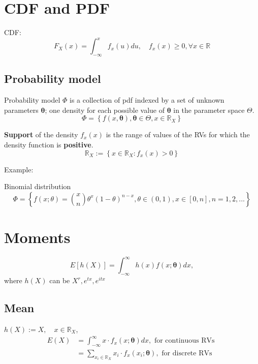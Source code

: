 \documentclass[12pt]{article}
\title{}
\author{}
\date{}
\begin{document}
\maketitle


\section{CDF and PDF}
CDF:
\begin{equation*}
F_{X}(x) = \int_{ - \infty }^{x}f_{x}(u)du, \quad f_{x}(x) \ge 0, \forall x \in \mathbb{R} 
\end{equation*}


\subsection{Probability model}
Probability model $ \Phi $ is a collection of pdf indexed by a set of unknown parameters
$ \bm{\theta} $; one density for each possible value of $ \bm{\theta} $ in the parameter
space $ \Theta $.
\begin{equation*}
\Phi = \left\{ f(x,\bm{\theta}), \bm{\theta}\in \Theta, x \in \mathbb{R}_{X} \right\} 
\end{equation*}

{\textbf {Support}} of the density $ f_{x}(x) $ is the range of values of the RVs for which the
density function is {\textbf {positive}}.
\begin{equation*}
\mathbb{R}_{X}:=\left\{ x \in \mathbb{R}_{X}: f_{x}(x) > 0 \right\} 
\end{equation*}

Example:

Binomial distribution
\begin{equation*}
\Phi = \left\{ f(x;\theta) = \binom{x}{n}\theta^{x}(1 - \theta)^{n - x},
\theta \in (0,1), x \in [0,n], n = 1,2,...\right\} 
\end{equation*}


\section{Moments}
\begin{equation*}
	E[h(X)] = \int_{ - \infty }^{\infty }h(x)f(x;\bm{\theta})dx, 
\end{equation*}
where $ h(X) $ can be $ X^{r}, e^{tx}, e^{itx} $


\subsection{Mean}
$ h(X):= X , \quad x \in \mathbb{R}_{X}$, 
\begin{align*}
	E(X) &= \int_{ - \infty }^{\infty } x \cdot f_{x}(x;\bm{\theta})dx, \text{ for continuous RVs }\\
	&= \sum\limits_{x_{i}\in \mathbb{R}_{X}} x_{i}\cdot f_{x}(x_{i};\bm{\theta}), \text{ for 
	discrete RVs}
\end{align*}
\end{document}
